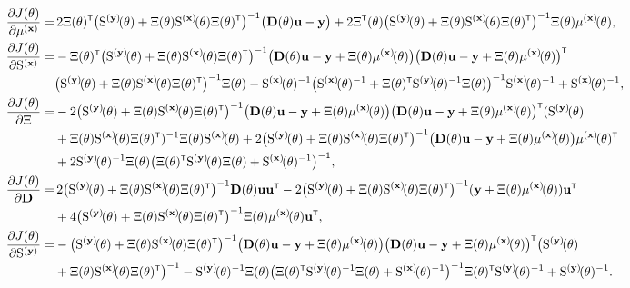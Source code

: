 \begin{align}
        \pdv{J(\vctheta)}{\mu^{(\mathbf{x})}} 
        =& \, 
        2 \Xitheta^\tr
        \big(\Sbfytheta + \Xitheta \Sbfxtheta \Xitheta^\tr\big)^{-1}
        \big(\mathbf{D}(\vctheta) \mathbf{u} - \mathbf{y}\big) 
        + 
        2\Xi^\tr(\vctheta) \big(\Sbfytheta + \Xitheta \Sbfxtheta \Xitheta^\tr\big)^{-1}\Xitheta \mubfxtheta ,\label{eq:derivative to mux}\\ 
        \pdv{J(\vctheta)}{\mxS^{(\mathbf{x})}} =& -\Xitheta^\tr\big(\Sbfytheta + \Xitheta \Sbfxtheta \Xitheta^\tr\big)^{-1} \big(\mathbf{D}(\vctheta)\mathbf{u} - \mathbf{y} + \Xitheta \mubfxtheta\big) \big(\mathbf{D}(\vctheta)\mathbf{u} - \mathbf{y} + \Xitheta \mubfxtheta\big)^\tr 
        \nonumber
        \\
        &\big(\Sbfytheta + \Xitheta \Sbfxtheta \Xitheta^\tr\big)^{-1}\Xitheta  - \Sbfxtheta^{-1}\big(\Sbfxtheta^{-1} + \Xitheta^\tr \Sbfytheta^{-1} \Xitheta\big)^{-1} \Sbfxtheta^{-1} + \Sbfxtheta^{-1},
        \label{eq:derivative to Sx}\\
        \pdv{J(\vctheta)}{\Xi} =& -2\big(\Sbfytheta + \Xitheta \Sbfxtheta \Xitheta^\tr\big)^{-1} \big(\mathbf{D}(\vctheta)\mathbf{u} - \mathbf{y} + \Xitheta \mubfxtheta\big) \big(\mathbf{D}(\vctheta)\mathbf{u} - \mathbf{y} + \Xitheta \mubfxtheta\big)^\tr (\Sbfytheta 
        \nonumber\\
        &+\Xitheta \Sbfxtheta \Xitheta^\tr)^{-1}\Xitheta \Sbfxtheta +2\big(\Sbfytheta + \Xitheta \Sbfxtheta \Xitheta^\tr\big)^{-1}\big(\mathbf{D}(\vctheta)\mathbf{u}-\mathbf{y} + \Xitheta \mubfxtheta\big) \mubfxtheta^\tr 
        \nonumber\\
        &+ 2\Sbfytheta^{-1} \Xitheta \big(\Xitheta^\tr \Sbfytheta \Xitheta + \Sbfxtheta^{-1}\big)^{-1},
        \label{eq:derivative to Xi}\\
        \pdv{J(\vctheta)}{\mathbf{D}} =& \, 2\big(\Sbfytheta + \Xitheta \Sbfxtheta \Xitheta^\tr\big)^{-1}\mathbf{D}(\vctheta)\mathbf{u}\mathbf{u}^\tr - 2\big(\Sbfytheta + \Xitheta \Sbfxtheta \Xitheta^\tr\big)^{-1}(\mathbf{y}+\Xitheta \mubfxtheta)\mathbf{u}^\tr
        \nonumber\\
        &+ 4\big(\Sbfytheta + \Xitheta \Sbfxtheta \Xitheta^\tr\big)^{-1}\Xitheta \mubfxtheta \mathbf{u}^\tr,
        \label{eq:derivative to D}\\
        \pdv{J(\vctheta)}{\mxS^{(\mathbf{y})}} =& -\big(\Sbfytheta + \Xitheta \Sbfxtheta \Xitheta^\tr\big)^{-1} \big(\mathbf{D}(\vctheta)\mathbf{u} - \mathbf{y} + \Xitheta \mubfxtheta\big) \big(\mathbf{D}(\vctheta)\mathbf{u} - \mathbf{y} + \Xitheta \mubfxtheta\big)^\tr \big(\Sbfytheta 
        \nonumber\\
        &+ \Xitheta \Sbfxtheta \Xitheta^\tr\big)^{-1}  - \Sbfytheta^{-1} \Xitheta\big(\Xitheta^\tr \Sbfytheta^{-1} \Xitheta + \Sbfxtheta^{-1}\big)^{-1}\Xitheta^\tr\Sbfytheta^{-1} + \Sbfytheta^{-1}.
        \label{eq:derivative to Sy}
\end{align}
